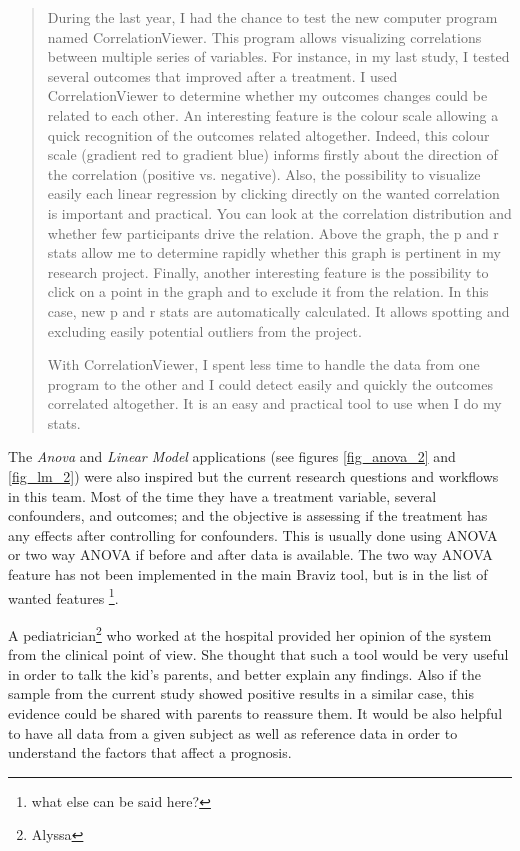 \begin{quote}
During the last year, I had the chance to test the new computer program named CorrelationViewer. This program allows visualizing correlations between multiple series of variables. For instance, in my last study, I tested several outcomes that improved after a treatment. I used CorrelationViewer to determine whether my outcomes changes could be related to each other. An interesting feature is the colour scale allowing a quick recognition of the outcomes related altogether. Indeed, this colour scale (gradient red to gradient blue) informs firstly about the direction of the correlation (positive vs. negative). Also, the possibility to visualize easily each linear regression by clicking directly on the wanted correlation is important and practical. You can look at the correlation distribution and whether few participants drive the relation. Above the graph, the p and r stats allow me to determine rapidly whether this graph is pertinent in my research project. Finally, another interesting feature is the possibility to click on a point in the graph and to exclude it from the relation. In this case, new p and r stats are automatically calculated. It allows spotting and excluding easily potential outliers from the project.

With CorrelationViewer, I spent less time to handle the data from one program to the other and I could detect easily and quickly the outcomes correlated altogether. It is an easy and practical tool to use when I do my stats. 
\end{quote}

The \emph{Anova} and \emph{Linear Model} applications (see figures \ref{fig_anova_2} and \ref{fig_lm_2}) were also inspired but the current research questions and workflows in this team. Most of the time they have a treatment variable, several confounders, and outcomes; and the objective is assessing if the treatment has any effects after controlling for confounders. This is usually done using ANOVA or two way ANOVA if before and after data is available. The two way ANOVA feature has not been implemented in the main Braviz tool, but is in the list of wanted features \footnote{what else can be said here?}. 

% 


A pediatrician\footnote{Alyssa} who worked at the hospital provided her opinion of the system from the clinical point of view. She thought that such a tool would be very useful in order to talk the kid's parents, and better explain any findings. Also if the sample from the current study showed positive results in a similar case, this evidence could be shared with parents to reassure them. It would be also helpful to have all data from a given subject as well as reference data in order to understand the factors that affect a prognosis. 


